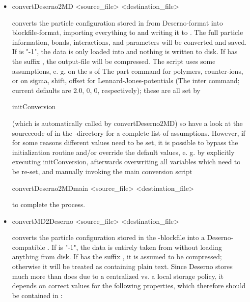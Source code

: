 \begin{itemize}
 \item
\begin{code}
convertDeserno2MD <source_file> <destination_file>
\end{code}
converts the particle configuration stored in  from
Deserno-format into blockfile-format, importing everything to \es{}
and writing it to . The full particle
information, bonds, interactions, and parameters will be converted and
saved.  If  is "-1", the data is only loaded
into \es{} and nothing is written to disk.  If 
has the suffix , the output-file will be compressed.  The
script uses some assumptions, e. g. on the
s of The part command for polymers,
counter-ions, or on sigma, shift, offset for Lennard-Jones-potentials
(The inter command; current defaults are 2.0, 0, 0, respectively);
these are all set by
\begin{code}
initConversion 
\end{code}
(which is automatically called by convertDeserno2MD) so have a look at
the sourcecode of  in the
-directory for a complete list of assumptions.
However, if for some reasons different values need to be set, it is
possible to bypass the initialization routine and/or override the
default values, e. g. by explicitly executing initConversion,
afterwards overwriting all variables which need to be re-set, and
manually invoking the main conversion script
\begin{code}
convertDeserno2MDmain <source_file> <destination_file> 
\end{code}
  to complete the process.
 \item
\begin{code}
convertMD2Deserno <source_file> <destination_file>
\end{code}
converts the particle configuration stored in the \es{}-blockfile
 into a Deserno-compatible .
If  is "-1", the data is entirely taken from \es{}
without loading anything from disk.  If  has the
suffix , it is assumed to be compressed; otherwise it
will be treated as containing plain text.  Since Deserno stores much
more than \es{} does due to a centralized vs. a local storage policy,
it depends on correct values for the following properties, which
therefore should be contained in :

\end{itemize}
